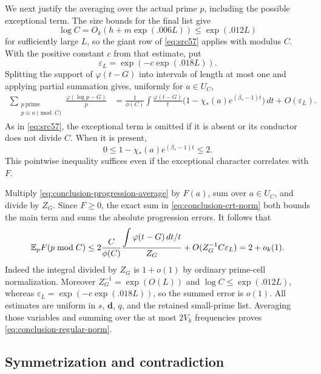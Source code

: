 We next justify the averaging over the actual prime $p$, including the
possible exceptional term.  The size bounds for the final list give
\[
 \log C=O_k(h+m\exp(.006L))\le\exp(.012L)
\]
for sufficiently large $L$, so the giant row of \eqref{eq:src57}
applies with modulus $C$.  With the positive constant $c$ from that
estimate, put
\[
 \varepsilon_L=\exp(-c\exp(.018L)).
\]
Splitting the support of $\varphi(t-G)$ into
intervals of length at most one and applying partial summation gives,
uniformly for $a\in U_C$,
\begin{align}
 \sum_{\substack{p\ \mathrm{prime}\\p\equiv a\pmod C}}
       \frac{\varphi(\log p-G)}p
 &=\frac1{\phi(C)}\int
       \frac{\varphi(t-G)}t
       \bigl(1-\chi_*(a)e^{(\beta_*-1)t}\bigr)\,dt
       +O(\varepsilon_L).
       \label{eq:conclusion-progression-average}
\end{align}
As in \eqref{eq:src57}, the exceptional term is omitted if it is
absent or its conductor does not divide $C$.  When it is present,
\[
 0\le1-\chi_*(a)e^{(\beta_*-1)t}\le2.
\]
This pointwise inequality suffices even if the exceptional character
correlates with $F$.

Multiply \eqref{eq:conclusion-progression-average} by $F(a)$, sum over
$a\in U_C$, and divide by $Z_G$.  Since $F\ge0$, the exact sum in
\eqref{eq:conclusion-crt-norm} both bounds the main term and sums the
absolute progression errors.  It follows that
\begin{equation}\label{eq:conclusion-prime-norm}
 \mathbb E_p F(p\bmod C)
 \le
 2\frac C{\phi(C)}
       \frac{\displaystyle\int\varphi(t-G)\,dt/t}{Z_G}
       +O(Z_G^{-1}C\varepsilon_L)
 =2+o_k(1).
\end{equation}
Indeed the integral divided by $Z_G$ is $1+o(1)$ by ordinary prime-cell
normalization.  Moreover $Z_G^{-1}=\exp(O(L))$ and
$\log C\le\exp(.012L)$, whereas
$\varepsilon_L=\exp(-c\exp(.018L))$, so the summed error is $o(1)$.
All estimates are uniform in $s$, $\mathbf d$, $q$, and the retained
small-prime list.  Averaging those variables and summing over the at
most $2V_k$ frequencies proves \eqref{eq:conclusion-regular-norm}.

\subsection{Symmetrization and contradiction}


